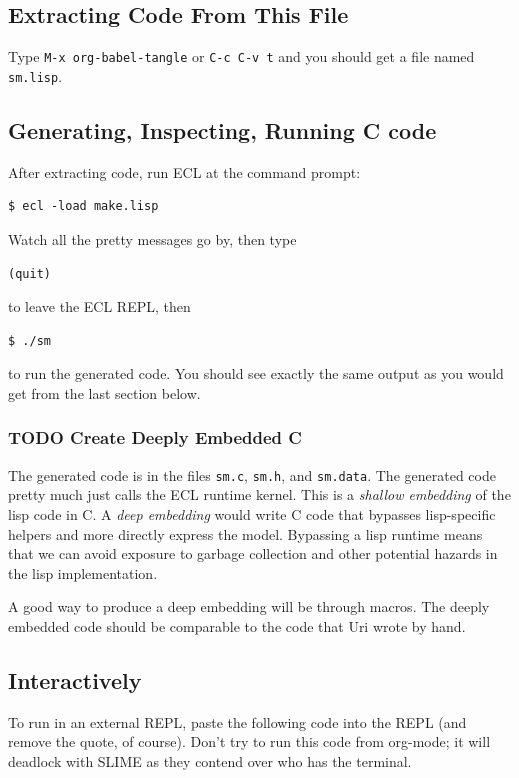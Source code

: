 \documentclass[10pt,oneside,x11names]{article}
\begin{document}
\subsection{Extracting Code From This File}
\label{sec:orgfec4b95}

Type \texttt{M-x org-babel-tangle} or \texttt{C-c C-v t} and you should get a file named
\texttt{sm.lisp}.

\subsection{Generating, Inspecting, Running C code}
\label{sec:org80678ce}

After extracting code, run ECL at the command prompt:
\begin{verbatim}
$ ecl -load make.lisp
\end{verbatim}
Watch all the pretty messages go by, then type
\begin{verbatim}
(quit)
\end{verbatim}
to leave the ECL REPL, then
\begin{verbatim}
$ ./sm
\end{verbatim}
to run the generated code. You should see exactly the same output as you
would get from the last section below.

\subsubsection{{\bfseries\sffamily TODO} Create Deeply Embedded C}
\label{sec:org7eee256}

The generated code is in the files \texttt{sm.c}, \texttt{sm.h}, and \texttt{sm.data}.  The
generated code pretty much just calls the ECL runtime kernel. This is a
\emph{shallow embedding} of the lisp code in C.  A \emph{deep embedding} would write C
code that bypasses lisp-specific helpers and more directly express the model.
Bypassing a lisp runtime means that we can avoid exposure to garbage
collection and other potential hazards in the lisp implementation.

A good way to produce a deep embedding will be through macros.  The deeply
embedded code should be comparable to the code that Uri wrote by hand.

\subsection{Interactively}
\label{sec:org7c37261}

To run in an external REPL, paste the following code into the REPL (and remove
the quote, of course). Don't try to run this code from org-mode; it will
deadlock with SLIME as they contend over who has the terminal.
\end{document}

